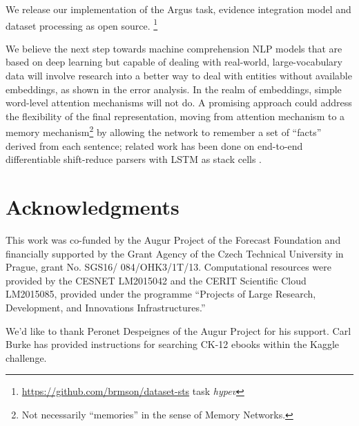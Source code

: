 \documentclass[11pt]{article}
\begin{document}
We release our implementation of the Argus task, evidence integration
model and dataset processing as open source.%
\footnote{\url{https://github.com/brmson/dataset-sts} task \textit{hypev}}

We believe the next step towards machine comprehension NLP models
that are based on deep learning but capable of dealing with real-world,
large-vocabulary data will involve research into a better way to deal with
entities without available embeddings, as shown in the error analysis.
In the realm of embeddings, simple word-level attention mechanisms will not do.
A promising approach could address
the flexibility of the final representation, moving from attention mechanism
to a memory mechanism\footnote{Not necessarily ``memories'' in the sense of Memory Networks.}
by allowing the network to remember a set of ``facts'' derived from each sentence;
related work has been done on end-to-end differentiable shift-reduce parsers
with LSTM as stack cells \cite{EndToEndParsing}.


\section*{Acknowledgments}
{\footnotesize
	This work was co-funded by the Augur Project of the Forecast Foundation
and financially supported by the Grant Agency of the Czech Technical
University in Prague, grant No. SGS16/ 084/OHK3/1T/13.
Computational resources were provided by the CESNET LM2015042 and the CERIT Scientific Cloud LM2015085,
provided under the programme ``Projects of Large Research, Development, and Innovations Infrastructures.''

We'd like to thank Peronet Despeignes of the Augur Project for his support.
Carl Burke has provided instructions for searching CK-12 ebooks within
the Kaggle challenge.}



\end{document}
